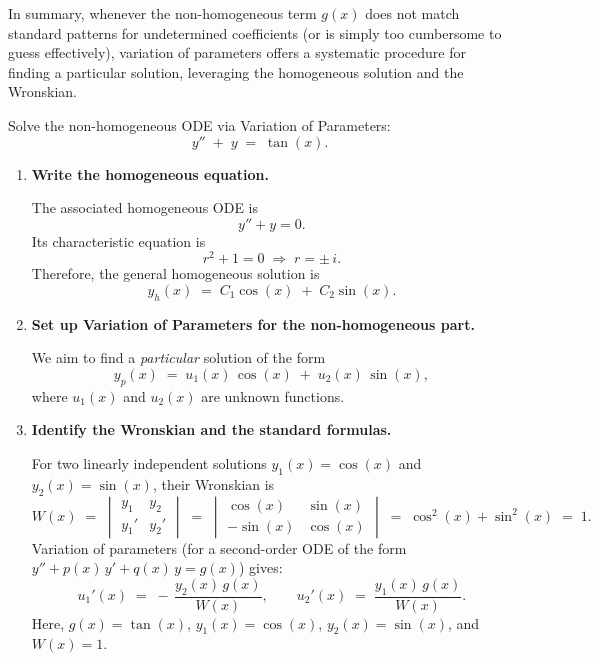 \noindent
In summary, whenever the non-homogeneous term $g(x)$ does not match standard patterns for undetermined coefficients (or is simply too cumbersome to guess effectively), variation of parameters offers a systematic procedure for finding a particular solution, leveraging the homogeneous solution and the Wronskian.

\exampleline
\begin{example}
Solve the non-homogeneous ODE via Variation of Parameters:
\[
y'' \;+\; y \;=\; \tan(x).
\]

\begin{solution}
\begin{enumerate}
\item \textbf{Write the homogeneous equation.}

   The associated homogeneous ODE is
   \[
   y'' + y = 0.
   \]
   Its characteristic equation is
   \[
   r^2 + 1 = 0
   \;\Longrightarrow\;
   r = \pm\,i.
   \]
   Therefore, the general homogeneous solution is
   \[
   y_h(x)
   \;=\;
   C_1 \cos(x) \;+\; C_2 \sin(x).
   \]

\item \textbf{Set up Variation of Parameters for the non-homogeneous part.}

   We aim to find a \emph{particular} solution of the form
   \[
   y_p(x)
   \;=\;
   u_1(x)\,\cos(x) \;+\; u_2(x)\,\sin(x),
   \]
   where \(u_1(x)\) and \(u_2(x)\) are unknown functions.

\item \textbf{Identify the Wronskian and the standard formulas.}

   For two linearly independent solutions \(y_1(x) = \cos(x)\) and \(y_2(x) = \sin(x)\), their Wronskian is
   \[
   W(x)
   \;=\;
   \begin{vmatrix}
   y_1 & y_2 \\
   y_1' & y_2'
   \end{vmatrix}
   \;=\;
   \begin{vmatrix}
   \cos(x) & \sin(x) \\
   -\sin(x) & \cos(x)
   \end{vmatrix}
   \;=\;
   \cos^2(x) + \sin^2(x)
   \;=\;
   1.
   \]
   Variation of parameters (for a second-order ODE of the form \(y'' + p(x)\,y' + q(x)\,y = g(x)\)) gives:
   \[
   u_1'(x)
   \;=\;
   -\,\frac{y_2(x)\,g(x)}{W(x)},
   \qquad
   u_2'(x)
   \;=\;
   \frac{y_1(x)\,g(x)}{W(x)}.
   \]
   Here, \(g(x) = \tan(x)\), \(y_1(x) = \cos(x)\), \(y_2(x) = \sin(x)\), and \(W(x) = 1\).


\end{enumerate}
\end{solution}
\end{example}
